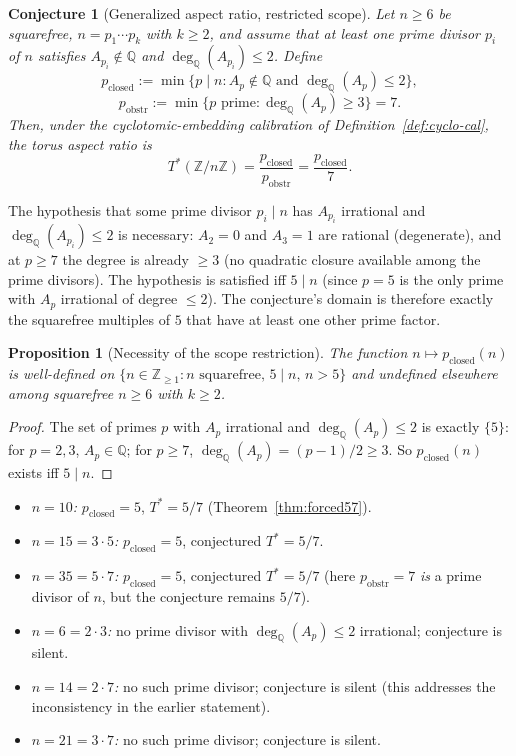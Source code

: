 \documentclass[11pt,reqno]{amsart}
\theoremstyle{plain}
\newtheorem{proposition}[theorem]{Proposition}
\newtheorem{conjecture}[theorem]{Conjecture}
\theoremstyle{definition}
\newcommand{\Z}{\mathbb{Z}}
\newcommand{\Q}{\mathbb{Q}}
\newcommand{\Zn}{\Z/n\Z}
\newcommand{\Tstar}{T^{*}}
\begin{document}
\begin{conjecture}[Generalized aspect ratio, restricted scope] \label{conj:gen}
Let $n \geq 6$ be squarefree, $n = p_1 \cdots p_k$ with $k \geq 2$, and assume that at least one prime divisor $p_i$ of $n$ satisfies $A_{p_i} \notin \Q$ and $\deg_{\Q}(A_{p_{i}}) \leq 2$. Define
\[
p_{\mathrm{closed}} := \min\{ p \mid n : A_p \notin \Q \text{ and } \deg_{\Q}(A_p) \leq 2 \},
\]
\[
p_{\mathrm{obstr}} := \min\{ p \text{ prime} : \deg_{\Q}(A_p) \geq 3 \} = 7.
\]
Then, under the cyclotomic-embedding calibration of Definition~\ref{def:cyclo-cal}, the torus aspect ratio is
\[
\Tstar(\Zn) = \frac{p_{\mathrm{closed}}}{p_{\mathrm{obstr}}} = \frac{p_{\mathrm{closed}}}{7}.
\]
\end{conjecture}

The hypothesis that some prime divisor $p_i \mid n$ has $A_{p_i}$ irrational and $\deg_{\Q}(A_{p_i}) \le 2$ is necessary: $A_2 = 0$ and $A_3 = 1$ are rational (degenerate), and at $p \geq 7$ the degree is already $\geq 3$ (no quadratic closure available among the prime divisors). The hypothesis is satisfied iff $5 \mid n$ (since $p = 5$ is the only prime with $A_p$ irrational of degree $\le 2$). The conjecture's domain is therefore exactly the squarefree multiples of $5$ that have at least one other prime factor.

\begin{proposition}[Necessity of the scope restriction] \label{prop:scope}
The function $n \mapsto p_{\mathrm{closed}}(n)$ is well-defined on $\{ n \in \mathbb{Z}_{\ge 1} : n \text{ squarefree}, \, 5 \mid n, \, n > 5 \}$ and undefined elsewhere among squarefree $n \geq 6$ with $k \geq 2$.
\end{proposition}

\begin{proof}
The set of primes $p$ with $A_p$ irrational and $\deg_{\Q}(A_p) \le 2$ is exactly $\{5\}$: for $p = 2, 3$, $A_p \in \Q$; for $p \ge 7$, $\deg_{\Q}(A_p) = (p-1)/2 \ge 3$. So $p_{\mathrm{closed}}(n)$ exists iff $5 \mid n$.
\end{proof}

\begin{itemize}
\item \emph{$n = 10$:} $p_{\mathrm{closed}} = 5$, $\Tstar = 5/7$ (Theorem~\ref{thm:forced57}).
\item \emph{$n = 15 = 3 \cdot 5$:} $p_{\mathrm{closed}} = 5$, conjectured $\Tstar = 5/7$.
\item \emph{$n = 35 = 5 \cdot 7$:} $p_{\mathrm{closed}} = 5$, conjectured $\Tstar = 5/7$ (here $p_{\mathrm{obstr}} = 7$ \emph{is} a prime divisor of $n$, but the conjecture remains $5/7$).
\item \emph{$n = 6 = 2 \cdot 3$:} no prime divisor with $\deg_{\Q}(A_{p}) \le 2$ irrational; conjecture is silent.
\item \emph{$n = 14 = 2 \cdot 7$:} no such prime divisor; conjecture is silent (this addresses the inconsistency in the earlier statement).
\item \emph{$n = 21 = 3 \cdot 7$:} no such prime divisor; conjecture is silent.
\end{itemize}
\end{document}
